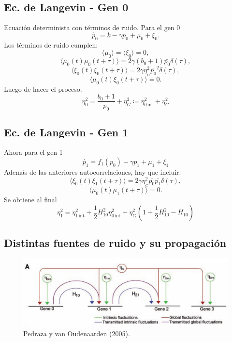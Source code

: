 \documentclass[xcolor=dvipsnames]{beamer}
\begin{document}
\subsection{Ec. de Langevin - Gen 0}
\begin{frame}
Ecuaci\'on determinista con t\'erminos de ruido. Para el gen 0
$$\dot{p_0} = k - \gamma p_0 + \mu_0 + \xi_{0}.$$
Los t\'erminos de ruido cumplen:
$$\langle \mu_0 \rangle = \langle \xi_0 \rangle = 0,$$
$$\langle \mu_0(t)\mu_0(t+\tau) \rangle  = 2\gamma (b_0+1) \bar{p_0} \delta(\tau),$$
$$\langle \xi_0(t)\xi_0(t+\tau) \rangle = 2 \gamma \eta_{_G}^2\bar{p_0}^2 \delta(\tau),$$
$$\langle \mu_0(t)\xi_0(t+\tau) \rangle = 0.$$
Luego de hacer el proceso:
$$\eta_0^2=\frac{b_0+1}{\bar{p_0}} + \eta_{G}^2\coloneqq\eta_{0\,\text{int}}^2+\eta_{G}^2$$
\end{frame}

\subsection{Ec. de Langevin - Gen 1}
\begin{frame}
Ahora para el gen 1
$$\dot{p_1} = f_1(p_{0}) - \gamma p_1 + \mu_1 + \xi_1$$
Adem\'as de las anteriores autocorrelaciones, hay que incluir:
$$\langle \xi_0(t)\xi_1(t+\tau) \rangle = 2 \gamma \eta_{_G}^2\bar{p_0}\bar{p_1}\delta(\tau),$$
$$\langle \mu_0(t)\mu_1(t+\tau) \rangle =0.$$
Se obtiene al final
$$\eta_1^2 = \eta_{1\,\text{int}}^2 + \frac{1}{2} H_{10}^2 \eta_{0\,\text{int}}^2 + \eta_G^2\left( 1 + \frac{1}{2} H_{10}^2 - H_{10} \right)$$
\end{frame}

\subsection{Distintas fuentes de ruido y su propagaci\'on}
\begin{frame}
\begin{figure}[p]
    \centering
    \includegraphics[width=\textwidth]{globalint.png}\\
    \tiny Pedraza y van Oudenaarden (2005).
\end{figure}
\end{frame}
\end{document}
